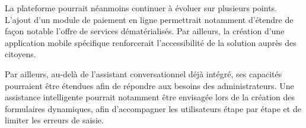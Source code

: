 La plateforme pourrait néanmoins continuer à évoluer sur plusieurs points. L'ajout d'un module de paiement en ligne permettrait notamment d'étendre de façon notable l'offre de services dématérialisés. Par ailleurs, la création d'une application mobile spécifique renforcerait l'accessibilité de la solution auprès des citoyens. 

Par ailleurs, au-delà de l’assistant conversationnel déjà intégré, ses capacités pourraient être étendues afin de répondre aux besoins des administrateurs. Une assistance intelligente pourrait notamment être envisagée lors de la création des formulaires dynamiques, afin d’accompagner les utilisateurs étape par étape et de limiter les erreurs de saisie.
